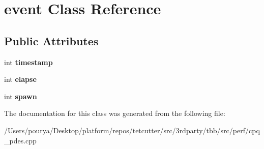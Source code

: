 \hypertarget{classevent}{}\section{event Class Reference}
\label{classevent}
\subsection*{Public Attributes}
\begin{DoxyCompactItemize}
\item 
\hypertarget{classevent_a090463f5ef46f22143f2868eb185e276}{}int {\bfseries timestamp}\label{classevent_a090463f5ef46f22143f2868eb185e276}

\item 
\hypertarget{classevent_abace97244c5b53ee1764e1e4054e20c6}{}int {\bfseries elapse}\label{classevent_abace97244c5b53ee1764e1e4054e20c6}

\item 
\hypertarget{classevent_af7ea82f7fa338c219a835937d4612565}{}int {\bfseries spawn}\label{classevent_af7ea82f7fa338c219a835937d4612565}

\end{DoxyCompactItemize}


The documentation for this class was generated from the following file\+:\begin{DoxyCompactItemize}
\item 
/\+Users/pourya/\+Desktop/platform/repos/tetcutter/src/3rdparty/tbb/src/perf/cpq\+\_\+pdes.\+cpp\end{DoxyCompactItemize}
